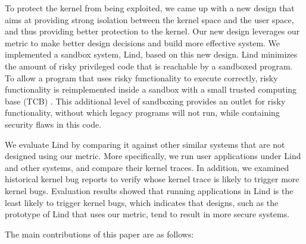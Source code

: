 To protect the kernel from being exploited, we came up with a new design 
that aims at providing strong isolation between the kernel space and the user space, 
and thus providing better protection to the kernel. Our new design leverages 
our metric to make better design decisions and build more effective system. 
We implemented a sandbox system, Lind, based on this new design.
Lind minimizes the amount of risky privileged code that is reachable by a
sandboxed program.  To allow a program that uses risky functionality to
execute correctly, risky functionality is reimplemented inside a sandbox with
a small trusted computing base (TCB) . 
This additional level of sandboxing provides an outlet for risky functionality, without which
legacy programs will not run, while containing security flaws in this code. 

We evaluate Lind by comparing it against other similar systems 
that are not designed using our metric. 
More specifically, we run user applications
under Lind and other systems, and compare their kernel traces. In addition, we examined historical
kernel bug reports to verify whose kernel trace is likely to trigger more
kernel bugs. 
Evaluation results showed that running applications in Lind is the least likely to trigger kernel bugs, 
which indicates that designs, such as the prototype of Lind that uses our metric, 
tend to result in more secure systems. 

The main contributions of this paper are as follows:

